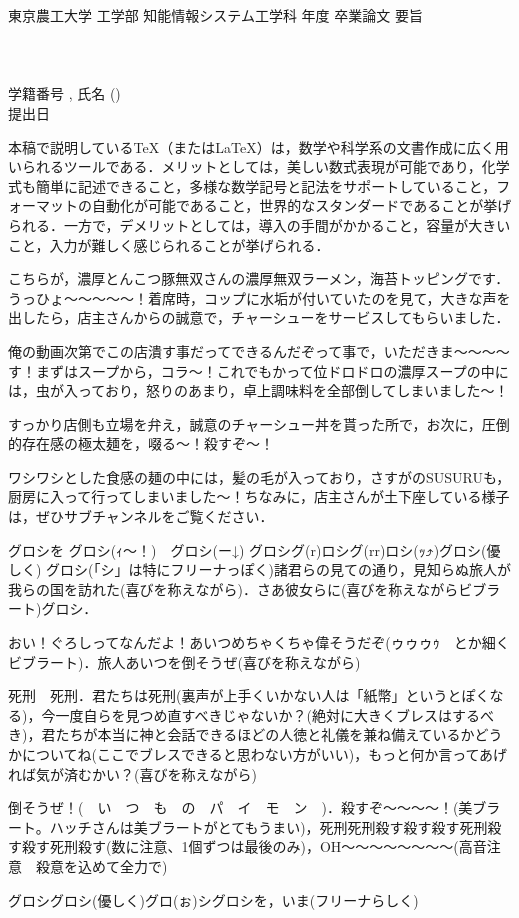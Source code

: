 \documentclass[main]{subfiles}
\begin{document}
{\centering 東京農工大学 工学部 知能情報システム工学科 \yearOfGraduation 年度 卒業論文 要旨\\
~\\
\titleJa
\\
\titleEn
\\
学籍番号 \studentNumber, 氏名 \myNameJa(\myNameEn)\\
提出日　\dateOfSubmissionAbs\\}


本稿で説明している\TeX （または\LaTeX ）は，数学や科学系の文書作成に広く用いられるツールである．メリットとしては，美しい数式表現が可能であり，化学式も簡単に記述できること，多様な数学記号と記法をサポートしていること，フォーマットの自動化が可能であること，世界的なスタンダードであることが挙げられる．一方で，デメリットとしては，導入の手間がかかること，容量が大きいこと，入力が難しく感じられることが挙げられる．

こちらが，濃厚とんこつ豚無双さんの濃厚無双ラーメン，海苔トッピングです．うっひょ～～～～～！着席時，コップに水垢が付いていたのを見て，大きな声を出したら，店主さんからの誠意で，チャーシューをサービスしてもらいました．

俺の動画次第でこの店潰す事だってできるんだぞって事で，いただきま～～～～す！まずはスープから，コラ～！これでもかって位ドロドロの濃厚スープの中には，虫が入っており，怒りのあまり，卓上調味料を全部倒してしまいました～！

すっかり店側も立場を弁え，誠意のチャーシュー丼を貰った所で，お次に，圧倒的存在感の極太麺を，啜る～！殺すぞ～！

ワシワシとした食感の麺の中には，髪の毛が入っており，さすがのSUSURUも，厨房に入って行ってしまいました～！ちなみに，店主さんが土下座している様子は，ぜひサブチャンネルをご覧ください．

グロシを グロシ(ｨ〜！)　グロシ(ー↓) グロシグ(r)ロシグ(rr)ロシ(ｯ︎⤴️)グロシ(優しく) グロシ(「シ」は特にフリーナっぽく)諸君らの見ての通り，見知らぬ旅人が我らの国を訪れた(喜びを称えながら)．さあ彼女らに(喜びを称えながらビブラート)グロシ．

おい！ぐろしってなんだよ！あいつめちゃくちゃ偉そうだぞ(ゥゥゥｩ　とか細くビブラート)．旅人あいつを倒そうぜ(喜びを称えながら)

死刑　死刑．君たちは死刑(裏声が上手くいかない人は「紙幣」というとぽくなる)，今一度自らを見つめ直すべきじゃないか？(絶対に大きくブレスはするべき)，君たちが本当に神と会話できるほどの人徳と礼儀を兼ね備えているかどうかについてね(ここでブレスできると思わない方がいい)，もっと何か言ってあげれば気が済むかい？(喜びを称えながら)

倒そうぜ！(　い　つ　も　の　パ　イ　モ　ン　)．殺すぞ〜〜〜〜！(美ブラート。ハッチさんは美ブラートがとてもうまい)，死刑死刑殺す殺す殺す死刑殺す殺す死刑殺す(数に注意、1個ずつは最後のみ)，OH〜〜〜〜〜〜〜〜(高音注意　殺意を込めて全力で)

グロシグロシ(優しく)グロ(ぉ)シグロシを，いま(フリーナらしく)
\clearpage
\end{document}

